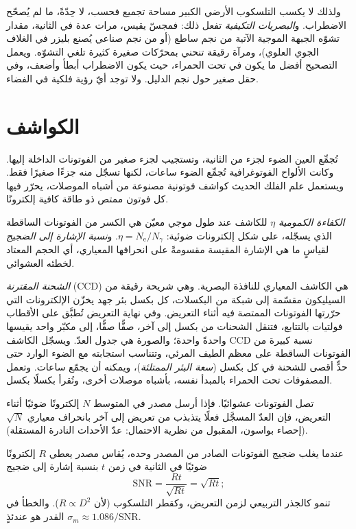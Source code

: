 ولذلك لا يكسب التلسكوب الأرضي الكبير مساحة تجميع فحسب، لا حِدّةً، ما لم يُصحّح الاضطراب. و\emph{البصريات التكيفية} تفعل ذلك: فمجسّ يقيس، مرات عدة في الثانية، مقدار تشوّه الجبهة الموجية الآتية من نجم ساطع (أو من نجم صناعي يُصنع بليزر في الغلاف الجوي العلوي)، ومرآة رقيقة تنحني بمحرّكات صغيرة كثيرة تلغي التشوّه. ويعمل التصحيح أفضل ما يكون في تحت الحمراء، حيث يكون الاضطراب أبطأ وأضعف، وفي حقل صغير حول نجم الدليل. ولا توجد أيّ رؤية فلكية في الفضاء.

\section{الكواشف}

تُجمِّع العين الضوء لجزء من الثانية، وتستجيب لجزء صغير من الفوتونات الداخلة إليها. وكانت الألواح الفوتوغرافية تُجمِّع الضوء ساعات، لكنها تسجّل منه جزءًا صغيرًا فقط. ويستعمل علم الفلك الحديث كواشف فوتونية مصنوعة من أشباه الموصلات، يحرّر فيها كل فوتون ممتص ذو طاقة كافية إلكترونًا.

\begin{definition}\label{def:b1:observing-the-sky:detector}
\emph{الكفاءة الكمومية} $\eta$ للكاشف عند طول موجي معيّن هي الكسر من الفوتونات الساقطة الذي يسجّله، على شكل إلكترونات ضوئية: $\eta = N_\mathrm{e}/N_\gamma$. و\emph{نسبة الإشارة إلى الضجيج} لقياسٍ ما هي الإشارة المقيسة مقسومةً على انحرافها المعياري، أي الحجم المعتاد لخطئه العشوائي.
\end{definition}

\emph{الشحنة المقترنة} (CCD) هي الكاشف المعياري للنافذة البصرية. وهي شريحة رقيقة من السيليكون مقسّمة إلى شبكة من البكسلات، كل بكسل بئر جهد يخزّن الإلكترونات التي حرّرتها الفوتونات الممتصة فيه أثناء التعريض. وفي نهاية التعريض تُطبَّق على الأقطاب فولتيات بالتتابع، فتنقل الشحنات من بكسل إلى آخر، صفًّا صفًّا، إلى مكبّر واحد يقيسها واحدةً واحدة؛ والصورة هي جدول العدّ. ويسجّل الكاشف CCD نسبة كبيرة من الفوتونات الساقطة على معظم الطيف المرئي، وتتناسب استجابته مع الضوء الوارد حتى حدٍّ أقصى للشحنة في كل بكسل (\emph{سعة البئر الممتلئة})، ويمكنه أن يجمّع ساعات. وتعمل المصفوفات تحت الحمراء بالمبدأ نفسه، بأشباه موصلات أخرى، وتُقرأ بكسلًا بكسل.

تصل الفوتونات عشوائيًا. فإذا أرسل مصدر في المتوسط $N$ إلكترونًا ضوئيًا أثناء التعريض، فإن العدّ المسجَّل فعلًا يتذبذب من تعريض إلى آخر بانحراف معياري $\sqrt N$ (إحصاء بواسون، المقبول من نظرية الاحتمال: عدّ الأحداث النادرة المستقلة).

\begin{proposition}\label{prop:b1:observing-the-sky:snr}
عندما يغلب ضجيج الفوتونات الصادر من المصدر وحده، يُقاس مصدر يعطي $R$ إلكترونًا ضوئيًا في الثانية في زمن $t$ بنسبة إشارة إلى ضجيج
\[
  \mathrm{SNR} = \frac{Rt}{\sqrt{Rt}} = \sqrt{Rt} ;
\]
تنمو كالجذر التربيعي لزمن التعريض، وكقطر التلسكوب (لأن $R \propto D^2$). والخطأ في القدر هو عندئذٍ $\sigma_m \approx 1.086/\mathrm{SNR}$.
\end{proposition}

